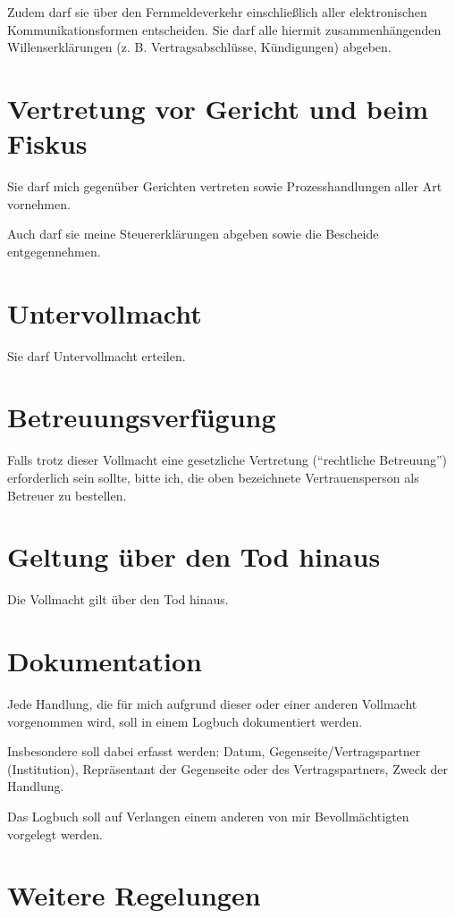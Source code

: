 \documentclass[pdftex,12pt,a4paper]{article}
\begin{document}
Zudem darf sie über den Fernmeldeverkehr einschließlich aller elektronischen
Kommunikationsformen entscheiden. Sie darf alle hiermit zusammenhängenden
Willenserklärungen (z. B. Vertragsabschlüsse, Kündigungen) abgeben. 

\section{Vertretung vor Gericht und beim Fiskus} 

Sie darf mich gegenüber Gerichten vertreten sowie Prozesshandlungen aller Art
vornehmen. 

Auch darf sie meine Steuererklärungen abgeben sowie die Bescheide 
entgegennehmen.

\section{Untervollmacht}

Sie darf Untervollmacht erteilen. 

\section{Betreuungsverfügung}

Falls trotz dieser Vollmacht eine gesetzliche Vertretung (\enquote{rechtliche Betreuung}) erforderlich
sein sollte, bitte ich, die oben bezeichnete Vertrauensperson als Betreuer zu bestellen. 

\section{Geltung über den Tod hinaus}

Die Vollmacht gilt über den Tod hinaus. 

\section{Dokumentation}

Jede Handlung, die für mich aufgrund dieser oder einer anderen 
Vollmacht vorgenommen wird, soll in einem Logbuch dokumentiert werden.

Insbesondere soll dabei erfasst werden: Datum, Gegenseite/Vertragspartner
(Institution), Repräsentant der Gegenseite oder des Vertragspartners,
Zweck der Handlung. 

Das Logbuch soll auf Verlangen einem anderen 
von mir Bevollmächtigten vorgelegt werden. 


\section{Weitere Regelungen}
\end{document}
